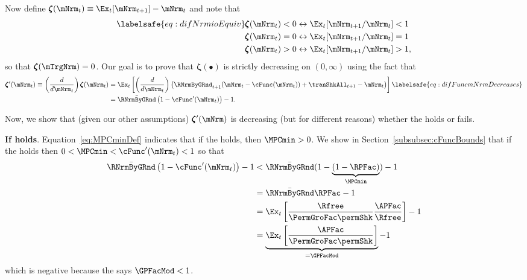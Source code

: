 \documentclass[\econtexRoot/BufferStockTheory]{subfiles}
\begin{document}
Now define \providecommand{\difFunc}{\pmb{\zeta}} $\difFunc(\mNrm_t) \equiv 
\Ex_t[\mNrm_{t+1}] - \mNrm_t$ and note that
\begin{align}\labelsafe{eq:difNrmioEquiv}
  \difFunc(\mNrm_t) < 0 &\leftrightarrow \Ex_t[{\mNrm}_{t+1}/\mNrm_t] < 1 
                          \nonumber\\
  \difFunc(\mNrm_t) = 0 &\leftrightarrow \Ex_t[{\mNrm}_{t+1}/\mNrm_t] = 1\\
  \difFunc(\mNrm_t) > 0 &\leftrightarrow \Ex_t[{\mNrm}_{t+1}/\mNrm_t] > 
                          1,\nonumber
\end{align}
so that $\difFunc(\mTrgNrm)=0$.
Our goal is to prove that $\difFunc(\bullet)$ is strictly 
decreasing on $(0,\infty)$ using the fact that
\begin{align}
  \difFunc^{\prime}(\mNrm_{t}) \equiv  \left( \frac{d}{d\mNrm_{t}}\right) \difFunc(\mNrm_t)  & = \Ex_{t}\left[
                                                                                               \left( \frac{d}{d\mNrm_{t}}\right) \left( 
                                                                                               {\RNrmByGRnd}_{t+1}(\mNrm_{t}-\cFunc(\mNrm_{t}))+%
                                                                                               {\tranShkAll}_{t+1} - {\mNrm}_t\right) \right] \labelsafe{eq:difFuncmNrmDecreases} \\
                                                                                             & = \bar{\RNrmByGRnd}\left(1-\cFunc^{\prime}({\mNrm}_t)\right) - 1.  \notag
\end{align}

Now, we show that (given our other assumptions) $\difFunc^{\prime}(\mNrm)$ is decreasing (but for different reasons) whether the {\RIC} holds or fails.

\textbf{If {\RIC} holds}.
Equation~\eqref{eq:MPCminDef} indicates that if the {\RIC} holds, then $\MPCmin >0$.
We show in Section~\ref{subsubsec:cFuncBounds} that if the {\RIC} holds then $0 < \MPCmin < \cFunc^{\prime}(\mNrm_{t}) < 1$ so that 
\begin{align*}
  \bar{\RNrmByGRnd}\left(1-\cFunc^{\prime}({\mNrm}_t)\right) - 1 & <  \bar{\RNrmByGRnd}(1-\underbrace{(1-\RPFac)}_{\MPCmin}) - 1  \\
                                                            & = \bar{\RNrmByGRnd}\RPFac - 1 \\
                                                            & = \Ex_{t}\left[\frac{\Rfree}{\PermGroFac \permShk}\frac{\APFac}{\Rfree}\right] - 1 \\
                                                            & = \underbrace{\Ex_{t}\left[\frac{\APFac}{\PermGroFac \permShk}\right]}_{= \GPFacMod} - 1 
\end{align*}
which is negative because the {\GICMod} says $\GPFacMod < 1$.
\end{document}
